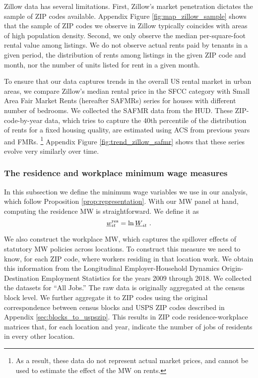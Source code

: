 Zillow data has several limitations.
First, Zillow's market penetration dictates the sample of ZIP codes available.
Appendix Figure \ref{fig:map_zillow_sample} shows that the sample of ZIP codes
we observe in Zillow typically coincides with areas of high population density.
Second, we only observe the median per-square-foot rental value among listings.
We do not observe actual rents paid by tenants in a given period, 
the distribution of rents among listings in the given ZIP code and month, nor
the number of units listed for rent in a given month.

To ensure that our data captures trends in the overall US rental market in 
urban areas, we compare Zillow's median rental price in the SFCC category with 
Small Area Fair Market Rents (hereafter SAFMRs) series for houses with 
different number of bedrooms.
We collected the SAFMR data from the HUD.
These ZIP-code-by-year data, which tries to capture the 40th percentile of the 
distribution of rents for a fixed housing quality, are estimated using ACS from
previous years and FMRs.%
\footnote{As a result, these data do not represent actual market prices, and 
cannot be used to estimate the effect of the MW on rents.}
%
%
Appendix Figure \ref{fig:trend_zillow_safmr} shows that these series evolve
very similarly over time.

\subsubsection{The residence and workplace minimum wage measures}
\label{sec:data_mw_measures}

In this subsection we define the minimum wage variables we use in our analysis,
which follow Proposition \ref{prop:representation}.
With our MW panel at hand, computing the residence MW is straightforward.
We define it as
\begin{equation*}
    \underline{w}^{\text{res}}_{it} = \ln \underline{W}_{it} \ .
\end{equation*}

We also construct the workplace MW, which captures the spillover effects of
statutory MW policies across locations.
To construct this measure we need to know, for each ZIP code, where workers 
residing in that location work.
We obtain this information from the Longitudinal Employer-Household 
Dynamics Origin-Destination Employment Statistics \parencite[LODES;][]{CensusLODES}
for the years 2009 through 2018.
We collected the datasets for ``All Jobs.''
The raw data is originally aggregated at the census block level. 
We further aggregate it to ZIP codes using the original correspondence between 
census blocks and USPS ZIP codes described in Appendix 
\ref{sec:blocks_to_uspszip}.
This results in ZIP code residence-workplace matrices that, for each location 
and year, indicate the number of jobs of residents in every other location.

